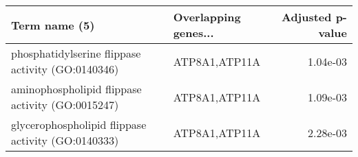 \begin{tabular}{llr}
\toprule
                                     Term name (5) & Overlapping genes... &  Adjusted p-value \\
\midrule
 phosphatidylserine flippase activity (GO:0140346) &        ATP8A1,ATP11A &          1.04e-03 \\
  aminophospholipid flippase activity (GO:0015247) &        ATP8A1,ATP11A &          1.09e-03 \\
glycerophospholipid flippase activity (GO:0140333) &        ATP8A1,ATP11A &          2.28e-03 \\
\bottomrule
\end{tabular}
